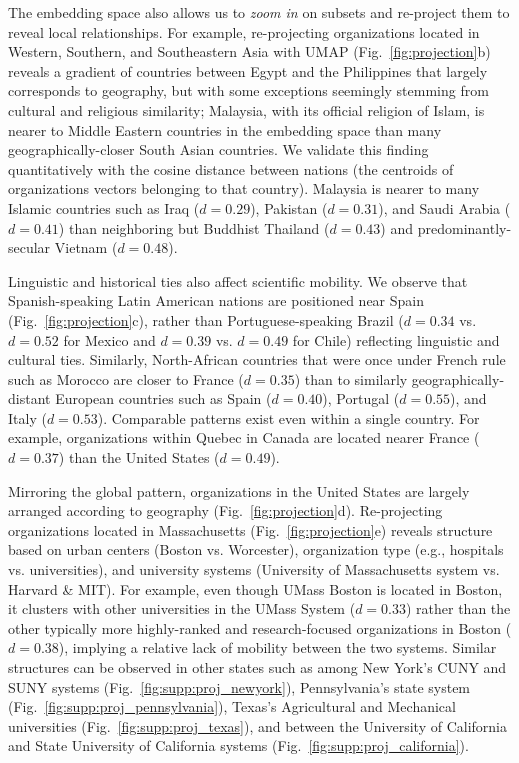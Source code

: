 \documentclass[12pt]{article} %
\begin{document}
The embedding space also allows us to \textit{zoom in} on subsets and re-project them to reveal local relationships.
For example, re-projecting organizations located in Western, Southern, and Southeastern Asia with UMAP (Fig.~\ref{fig:projection}b) reveals a gradient of countries between Egypt and the Philippines that largely corresponds to geography, but with some exceptions seemingly stemming from cultural and religious similarity;
Malaysia, with its official religion of Islam, is nearer to Middle Eastern countries in the embedding space than many geographically-closer South Asian countries.
We validate this finding quantitatively with the cosine distance between nations (the centroids of organizations vectors belonging to that country).
Malaysia is nearer to many Islamic countries such as Iraq ($d = 0.29$), Pakistan ($d = 0.31$), and Saudi Arabia ($d = 0.41$)  than neighboring but Buddhist Thailand ($d = 0.43$) and predominantly-secular Vietnam ($d = 0.48$).

Linguistic and historical ties also affect scientific mobility.
We observe that Spanish-speaking Latin American nations are positioned near Spain (Fig.~\ref{fig:projection}c), rather than Portuguese-speaking Brazil ($d = 0.34$ vs. $d = 0.52$ for Mexico and $d = 0.39$ vs. $d = 0.49$ for Chile) reflecting linguistic and cultural ties.
Similarly, North-African countries that were once under French rule such as Morocco are closer to France ($d =0.35$) than to similarly geographically-distant European countries such as Spain ($d = 0.40$), Portugal ($d = 0.55$), and Italy ($d = 0.53$).
Comparable patterns exist even within a single country.
For example, organizations within Quebec in Canada are located nearer France ($d = 0.37$) than the United States ($d = 0.49$).


Mirroring the global pattern, organizations in the United States are largely arranged according to geography (Fig.~\ref{fig:projection}d).
Re-projecting organizations located in Massachusetts (Fig.~\ref{fig:projection}e) reveals structure based on urban centers (Boston vs. Worcester), organization type (e.g., hospitals vs. universities), and university systems (University of  Massachusetts system vs. Harvard \& MIT).
For example, even though UMass Boston is located in Boston, it clusters with other universities in the UMass System ($d = 0.33$) rather than the other typically more highly-ranked and research-focused organizations in Boston ($d = 0.38$), implying a relative lack of mobility between the two systems.
Similar structures can be observed in other states such as among New York's CUNY and SUNY systems (Fig.~\ref{fig:supp:proj_newyork}), Pennsylvania's state system (Fig.~\ref{fig:supp:proj_pennsylvania}), Texas's Agricultural and Mechanical universities (Fig.~\ref{fig:supp:proj_texas}), and between the University of California and State University of California systems (Fig.~\ref{fig:supp:proj_california}).
\end{document}
